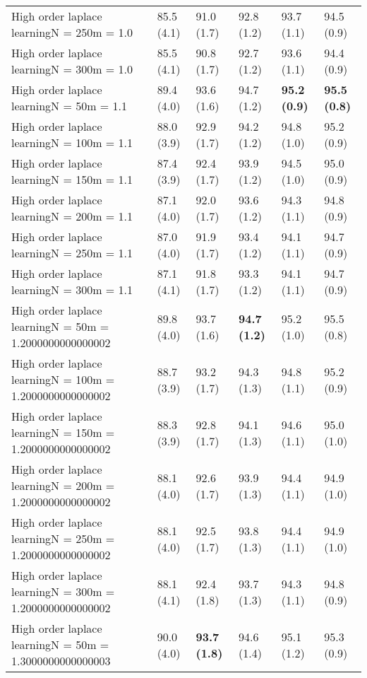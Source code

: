 \documentclass{article}
\begin{document}
\begin{table*}[t!]
\begin{center}
\begin{small}
\begin{sc}
\begin{tabular}{llllll}
High order laplace learningN = 250m = 1.0&85.5 (4.1)      &91.0 (1.7)      &92.8 (1.2)      &93.7 (1.1)      &94.5 (0.9)      \\
High order laplace learningN = 300m = 1.0&85.5 (4.1)      &90.8 (1.7)      &92.7 (1.2)      &93.6 (1.1)      &94.4 (0.9)      \\
High order laplace learningN = 50m = 1.1&89.4 (4.0)      &93.6 (1.6)      &94.7 (1.2)      &{\bf 95.2 (0.9)}&{\bf 95.5 (0.8)}\\
High order laplace learningN = 100m = 1.1&88.0 (3.9)      &92.9 (1.7)      &94.2 (1.2)      &94.8 (1.0)      &95.2 (0.9)      \\
High order laplace learningN = 150m = 1.1&87.4 (3.9)      &92.4 (1.7)      &93.9 (1.2)      &94.5 (1.0)      &95.0 (0.9)      \\
High order laplace learningN = 200m = 1.1&87.1 (4.0)      &92.0 (1.7)      &93.6 (1.2)      &94.3 (1.1)      &94.8 (0.9)      \\
High order laplace learningN = 250m = 1.1&87.0 (4.0)      &91.9 (1.7)      &93.4 (1.2)      &94.1 (1.1)      &94.7 (0.9)      \\
High order laplace learningN = 300m = 1.1&87.1 (4.1)      &91.8 (1.7)      &93.3 (1.2)      &94.1 (1.1)      &94.7 (0.9)      \\
High order laplace learningN = 50m = 1.2000000000000002&89.8 (4.0)      &93.7 (1.6)      &{\bf 94.7 (1.2)}&95.2 (1.0)      &95.5 (0.8)      \\
High order laplace learningN = 100m = 1.2000000000000002&88.7 (3.9)      &93.2 (1.7)      &94.3 (1.3)      &94.8 (1.1)      &95.2 (0.9)      \\
High order laplace learningN = 150m = 1.2000000000000002&88.3 (3.9)      &92.8 (1.7)      &94.1 (1.3)      &94.6 (1.1)      &95.0 (1.0)      \\
High order laplace learningN = 200m = 1.2000000000000002&88.1 (4.0)      &92.6 (1.7)      &93.9 (1.3)      &94.4 (1.1)      &94.9 (1.0)      \\
High order laplace learningN = 250m = 1.2000000000000002&88.1 (4.0)      &92.5 (1.7)      &93.8 (1.3)      &94.4 (1.1)      &94.9 (1.0)      \\
High order laplace learningN = 300m = 1.2000000000000002&88.1 (4.1)      &92.4 (1.8)      &93.7 (1.3)      &94.3 (1.1)      &94.8 (0.9)      \\
High order laplace learningN = 50m = 1.3000000000000003&90.0 (4.0)      &{\bf 93.7 (1.8)}&94.6 (1.4)      &95.1 (1.2)      &95.3 (0.9)      \\

\end{tabular}
\end{sc}
\end{small}
\end{center}
\end{table*}
\end{document}
